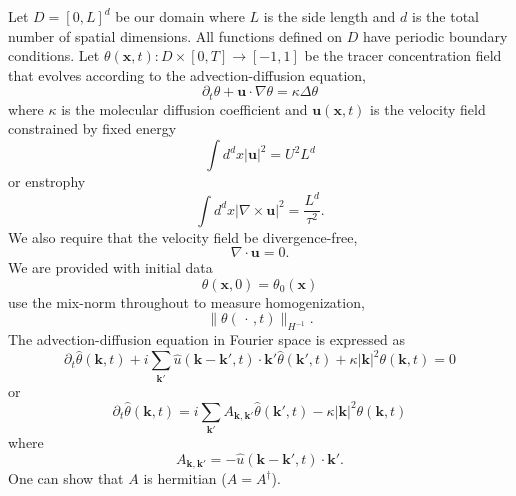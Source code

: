 \documentclass[12pt]{article}
\begin{document}
Let $D=[0,L]^{d}$ be our domain where $L$ is the side length and $d$ is the total number of spatial dimensions. All functions defined on $D$ have periodic boundary conditions. Let $\theta(\mathbf{x},t): D \times [0,T] \rightarrow [-1,1]$ be the tracer concentration field that evolves according to the advection-diffusion equation,
\begin{equation}
	\label{eq:PDE_advection2}
	\partial_{t}\theta+\mathbf{u}\cdot \nabla \theta=\kappa \Delta \theta
\end{equation}
where $\kappa$ is the molecular diffusion coefficient and $\mathbf{u}(\mathbf{x},t)$ is the velocity field constrained by fixed energy
\begin{equation}
	\label{eq:PDE_energy}
	\int d^{d}x  |\mathbf{u}|^{2} = U^{2}L^{d}
\end{equation}
or enstrophy
\begin{equation}
	\label{eq:PDE_enstrophy}
	\int d^{d}x |\nabla \times \mathbf{u}|^{2} = \frac{L^{d}}{\tau^{2}} .
\end{equation}
We also require that the velocity field be divergence-free,
\begin{equation}
	\label{eq:PDE_divfree2}
	\nabla\cdot \mathbf{u}=0.
\end{equation}
We are provided with initial data
\begin{equation}
	\label{eq:PDE_initial_condition2}
	\theta(\mathbf{x},0)=\theta_{0}(\mathbf{x})
\end{equation}
 use the mix-norm throughout to measure homogenization, 
\begin{equation}
	\label{eq:mixnorm}
  \|\theta(\,\cdot\,,t)\|_{H^{-1}}.
\end{equation}
The advection-diffusion equation in Fourier space is expressed as 
\begin{equation}
\label{eq:advection_spectral}
\partial_{t}\hat{\theta}(\mathbf{k},t)+i\sum_{\mathbf{k}'}\hat{u}(\mathbf{k}-\mathbf{k}',t)\cdot \mathbf{k}' \hat{\theta}(\mathbf{k}',t)+\kappa |\mathbf{k}|^2\theta(\mathbf{k},t)=0
\end{equation}
or 
\begin{equation}
\label{eq:advection_spectral_condensed}
\partial_{t}\hat{\theta}(\mathbf{k},t)=i\sum_{\mathbf{k}'}A_{\mathbf{k},\mathbf{k}'} \hat{\theta}(\mathbf{k}',t)-\kappa |\mathbf{k}|^2\theta(\mathbf{k},t)
\end{equation}
where 
\begin{equation}
A_{\mathbf{k},\mathbf{k}'}=-\hat{u}(\mathbf{k}-\mathbf{k}',t)\cdot \mathbf{k}'.
\end{equation}
One can show that $A$ is hermitian ($A=A^{\dagger}$).
\end{document}
